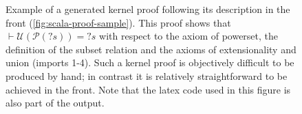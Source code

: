 \begin{figure}[H]
  \centering
  
  \caption[Sample proof (kernel)]{Example of a generated kernel proof following its description in the front (\autoref{fig:scala-proof-sample}). This proof shows that $\vdash \mathcal{U}(\mathcal{P}({?s})) = {?s}$ with respect to the axiom of powerset, the definition of the subset relation and the axioms of extensionality and union (imports 1-4). Such a kernel proof is objectively difficult to be produced by hand; in contrast it is relatively straightforward to be achieved in the front. Note that the latex code used in this figure is also part of the output.}
  \label{fig:lisa-proof-sample}
\end{figure}
